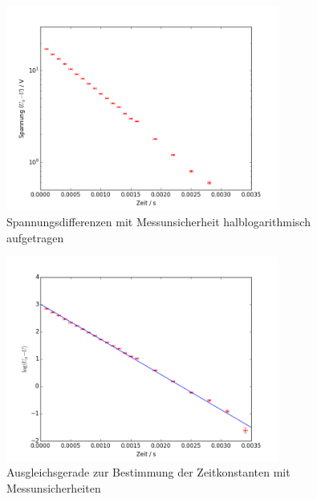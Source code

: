 \begin{figure}[h!]
	\centering
	\includegraphics[width=0.8\textwidth]{Spannung1.png}
	\caption{Spannungsdifferenzen mit Messunsicherheit halblogarithmisch aufgetragen}
	\label{fig:spannung1}
\end{figure} 

\begin{figure}[h!]
	\centering
	\includegraphics[width=0.8\textwidth]{Spannung2.png}
	\caption{Ausgleichsgerade zur Bestimmung der Zeitkonstanten mit Messunsicherheiten}
	\label{fig:Spannung2}
\end{figure} 

